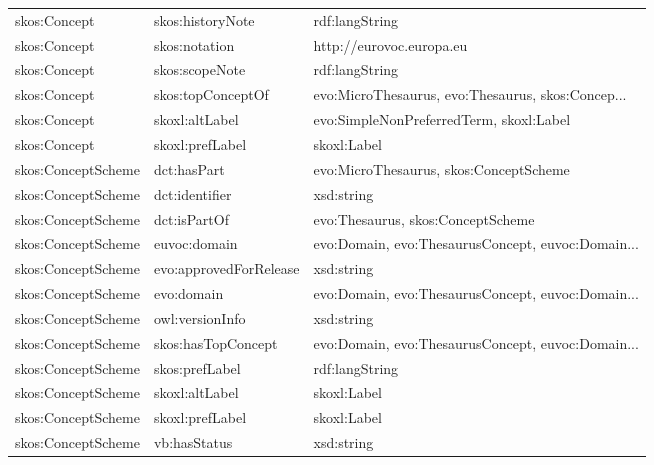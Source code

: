 \documentclass[10pt,a4paper,titlepage,final]{article}
\begin{document}
\begin{tabularx}{\textwidth}{llX}
               skos:Concept &        skos:historyNote &                                     rdf:langString \\
               skos:Concept &           skos:notation &                           http://eurovoc.europa.eu \\
               skos:Concept &          skos:scopeNote &                                     rdf:langString \\
               skos:Concept &       skos:topConceptOf &  evo:MicroThesaurus, evo:Thesaurus, skos:Concep... \\
               skos:Concept &          skoxl:altLabel &            evo:SimpleNonPreferredTerm, skoxl:Label \\
               skos:Concept &         skoxl:prefLabel &                                        skoxl:Label \\
         skos:ConceptScheme &             dct:hasPart &             evo:MicroThesaurus, skos:ConceptScheme \\
         skos:ConceptScheme &          dct:identifier &                                         xsd:string \\
         skos:ConceptScheme &            dct:isPartOf &                  evo:Thesaurus, skos:ConceptScheme \\
         skos:ConceptScheme &            euvoc:domain &  evo:Domain, evo:ThesaurusConcept, euvoc:Domain... \\
         skos:ConceptScheme &  evo:approvedForRelease &                                         xsd:string \\
         skos:ConceptScheme &              evo:domain &  evo:Domain, evo:ThesaurusConcept, euvoc:Domain... \\
         skos:ConceptScheme &         owl:versionInfo &                                         xsd:string \\
         skos:ConceptScheme &      skos:hasTopConcept &  evo:Domain, evo:ThesaurusConcept, euvoc:Domain... \\
         skos:ConceptScheme &          skos:prefLabel &                                     rdf:langString \\
         skos:ConceptScheme &          skoxl:altLabel &                                        skoxl:Label \\
         skos:ConceptScheme &         skoxl:prefLabel &                                        skoxl:Label \\
         skos:ConceptScheme &            vb:hasStatus &                                         xsd:string \\

\end{tabularx}
\end{document}
